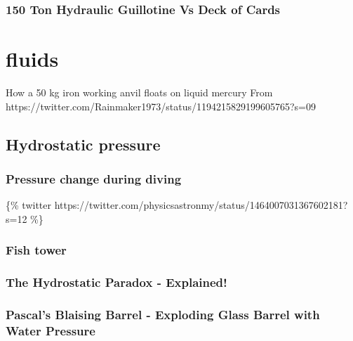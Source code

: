 \documentclass[
  letterpaper,
  DIV=11,
  numbers=noendperiod]{scrreprt}
\begin{document}
\subsection*{150 Ton Hydraulic Guillotine Vs Deck of
Cards}\label{ton-hydraulic-guillotine-vs-deck-of-cards}

\chapter*{fluids}\label{fluids}


How a 50 kg iron working anvil floats on liquid mercury From
https://twitter.com/Rainmaker1973/status/1194215829199605765?s=09

\section*{Hydrostatic pressure}\label{hydrostatic-pressure}


\subsection*{Pressure change during
diving}\label{pressure-change-during-diving}

\{\% twitter
https://twitter.com/physicsastronmy/status/1464007031367602181?s=12 \%\}

\subsection*{Fish tower}\label{fish-tower}

\subsection*{The Hydrostatic Paradox -
Explained!}\label{the-hydrostatic-paradox---explained}

\subsection*{Pascal's Blaising Barrel - Exploding Glass Barrel with
Water
Pressure}\label{pascals-blaising-barrel---exploding-glass-barrel-with-water-pressure}
\end{document}
